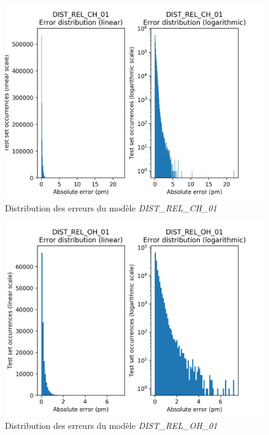 \begin{figure}
	\centering
	
	\includegraphics[scale=0.7]{../figures/DIST_REL_CH_01/DIST_REL_CH_01_distrib_rmse_val.png}	
	
	\caption{Distribution des erreurs du modèle \emph{DIST\_REL\_CH\_01}}
	\label{fdistrib_err_dist_rel_ch_01}

\end{figure}
\begin{figure}
	\centering
	
	\includegraphics[scale=0.7]{../figures/DIST_REL_OH_01/DIST_REL_OH_01_distrib_rmse_val.png}	
	
	\caption{Distribution des erreurs du modèle \emph{DIST\_REL\_OH\_01}}
	\label{fdistrib_err_dist_rel_oh_01}

\end{figure}

